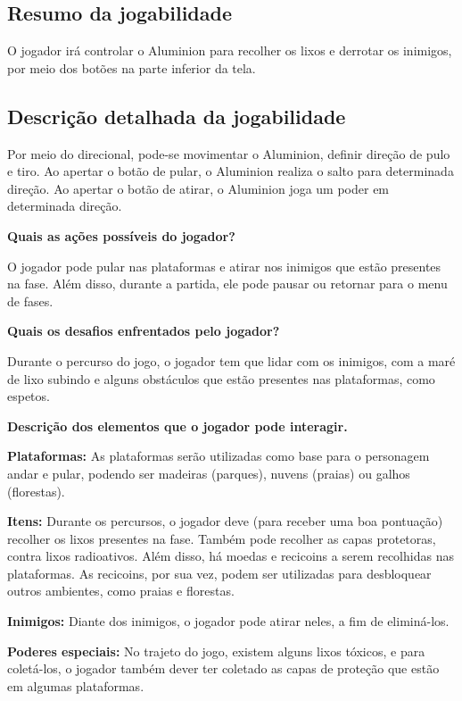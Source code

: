 \documentclass[]{scrartcl}
\begin{document}
\subsection{Resumo da jogabilidade}

O jogador irá controlar o Aluminion para recolher os lixos e derrotar os inimigos, por meio dos botões na parte inferior da tela.

\subsection{Descrição detalhada da jogabilidade}

Por meio do direcional, pode-se movimentar o Aluminion, definir direção de pulo e tiro. Ao apertar o botão de pular, o Aluminion realiza o salto para determinada direção. Ao apertar o botão de atirar, o Aluminion joga um poder em determinada direção.

\noindent\textbf{Quais as ações possíveis do jogador?}

O jogador pode pular nas plataformas e atirar nos inimigos que estão presentes na fase. Além disso, durante a partida, ele pode pausar ou retornar para o menu de fases.

\noindent\textbf{Quais os desafios enfrentados pelo jogador?}

Durante o percurso do jogo, o jogador tem que lidar com os inimigos, com a maré de lixo subindo e alguns obstáculos que estão presentes nas plataformas, como espetos.

\noindent\textbf{Descrição dos elementos que o jogador pode interagir.}

\textbf{Plataformas:} As plataformas serão utilizadas como base para o personagem andar e pular, podendo ser madeiras (parques), nuvens (praias) ou galhos (florestas).

\textbf{Itens:} Durante os percursos, o jogador deve (para receber uma boa pontuação) recolher os lixos presentes na fase. Também pode recolher as capas protetoras, contra lixos radioativos. Além disso, há moedas e recicoins a serem recolhidas nas plataformas. As recicoins, por sua vez, podem ser utilizadas para desbloquear outros ambientes, como praias e florestas.

\textbf{Inimigos:} Diante dos inimigos, o jogador pode atirar neles, a fim de eliminá-los.

\textbf{Poderes especiais:} No trajeto do jogo, existem alguns lixos tóxicos, e para coletá-los, o jogador também dever ter coletado as capas de proteção que estão em algumas plataformas.
\end{document}
